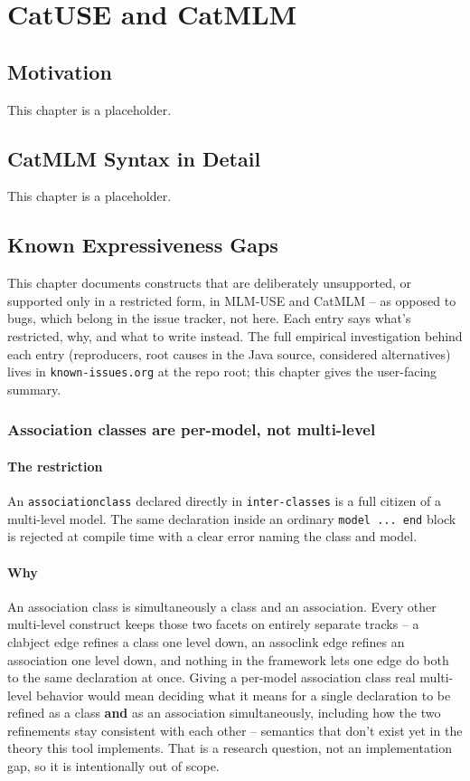 \documentclass[11pt,twoside,a4paper]{book}
\begin{document}
\part{CatUSE and CatMLM}
\label{sec:org29a1bf3}
\chapter{Motivation}
\label{sec:org9b145e9}
This chapter is a placeholder.
\chapter{CatMLM Syntax in Detail}
\label{sec:org189b488}
This chapter is a placeholder.
\chapter{Known Expressiveness Gaps}
\label{sec:org671565c}
This chapter documents constructs that are deliberately unsupported, or
supported only in a restricted form, in MLM-USE and CatMLM -- as opposed
to bugs, which belong in the issue tracker, not here. Each entry says
what's restricted, why, and what to write instead. The full empirical
investigation behind each entry (reproducers, root causes in the Java
source, considered alternatives) lives in \texttt{known-issues.org} at the repo
root; this chapter gives the user-facing summary.

\section{Association classes are per-model, not multi-level}
\label{sec:org15db427}

\subsection{The restriction}
\label{sec:orge22e22d}

An \texttt{associationclass} declared directly in \texttt{inter-classes} is a full
citizen of a multi-level model. The same declaration inside an ordinary
\texttt{model ... end} block is rejected at compile time with a clear error
naming the class and model.

\subsection{Why}
\label{sec:orgd82ac31}

An association class is simultaneously a class and an association. Every
other multi-level construct keeps those two facets on entirely separate
tracks -- a clabject edge refines a class one level down, an assoclink
edge refines an association one level down, and nothing in the framework
lets one edge do both to the same declaration at once. Giving a per-model
association class real multi-level behavior would mean deciding what it
means for a single declaration to be refined as a class \textbf{and} as an
association simultaneously, including how the two refinements stay
consistent with each other -- semantics that don't exist yet in the
theory this tool implements. That is a research question, not an
implementation gap, so it is intentionally out of scope.
\end{document}
